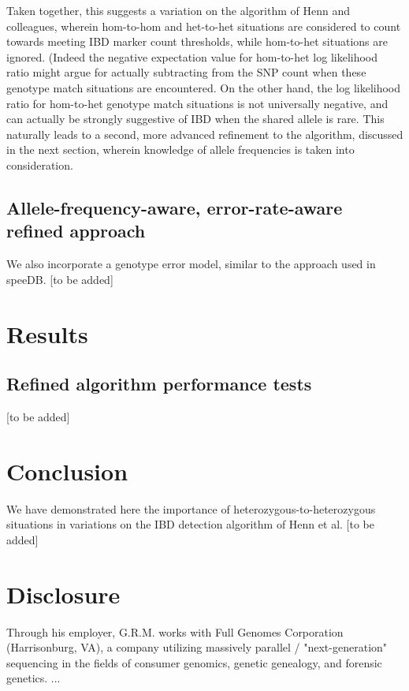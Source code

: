 \documentclass{article}
\begin{document}
Taken together, this suggests a variation on the algorithm of Henn and colleagues, wherein hom-to-hom and het-to-het situations are considered to count towards meeting IBD marker count thresholds, while hom-to-het situations are ignored. (Indeed the negative expectation value for hom-to-het log likelihood ratio might argue for actually subtracting from the SNP count when these genotype match situations are encountered. On the other hand, the log likelihood ratio for hom-to-het genotype match situations is not universally negative, and can actually be strongly suggestive of IBD when the shared allele is rare. This naturally leads to a second, more advanced refinement to the algorithm, discussed in the next section, wherein knowledge of allele frequencies is taken into consideration.

\subsection{Allele-frequency-aware, error-rate-aware refined approach}
We also incorporate a genotype error model, similar to the approach used in speeDB.\citep{speeDB}
[to be added]

\section{Results}
\subsection{Refined algorithm performance tests}
[to be added]

\section{Conclusion}
We have demonstrated here the importance of heterozygous-to-heterozygous situations in variations on the IBD detection algorithm of Henn et al. [to be added] 

\section{Disclosure}
Through his employer, G.R.M. works with Full Genomes Corporation (Harrisonburg, VA), a company utilizing massively parallel / "next-generation" sequencing in the fields of consumer genomics, genetic genealogy, and forensic genetics.
...



\end{document}
